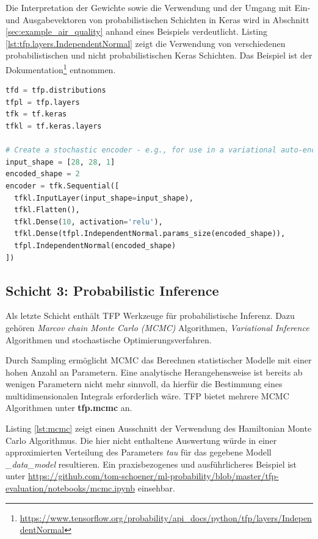 \documentclass[12pt]{article}
\begin{document}
Die Interpretation der Gewichte sowie die Verwendung und der Umgang mit Ein- und Ausgabevektoren von probabilistischen Schichten in Keras wird in Abschnitt \ref{sec:example_air_quality} anhand eines Beispiels verdeutlicht. Listing \ref{lst:tfp.layers.IndependentNormal} zeigt die Verwendung von verschiedenen probabilistischen und nicht probabilistischen Keras Schichten. Das Beispiel ist der Dokumentation\footnote{\url{https://www.tensorflow.org/probability/api_docs/python/tfp/layers/IndependentNormal}} entnommen. 

\begin{lstlisting}[language=Python, caption={Beispiel probabilistischer und nicht probabilistischer Keras Schichten}, label={lst:tfp.layers.IndependentNormal}]
tfd = tfp.distributions
tfpl = tfp.layers
tfk = tf.keras
tfkl = tf.keras.layers

# Create a stochastic encoder - e.g., for use in a variational auto-encoder
input_shape = [28, 28, 1]
encoded_shape = 2
encoder = tfk.Sequential([
  tfkl.InputLayer(input_shape=input_shape),
  tfkl.Flatten(),
  tfkl.Dense(10, activation='relu'),
  tfkl.Dense(tfpl.IndependentNormal.params_size(encoded_shape)),
  tfpl.IndependentNormal(encoded_shape)
])
\end{lstlisting}

\subsection{Schicht 3: Probabilistic Inference}
\label{sec:layer3}
Als letzte Schicht enthält TFP Werkzeuge für probabilistische Inferenz. Dazu gehören \textit{Marcov chain Monte Carlo (MCMC)} Algorithmen, \textit{Variational Inference} Algorithmen und stochastische Optimierungsverfahren. 

Durch Sampling ermöglicht MCMC das Berechnen statistischer Modelle mit einer hohen Anzahl an Parametern. Eine analytische Herangehensweise ist bereits ab wenigen Parametern nicht mehr sinnvoll, da hierfür die Bestimmung eines multidimensionalen Integrals erforderlich wäre. TFP bietet mehrere MCMC Algorithmen unter \textbf{tfp.mcmc} an. 

Listing \ref{lst:mcmc} zeigt einen Ausschnitt der Verwendung des Hamiltonian Monte Carlo Algorithmus. Die hier nicht enthaltene Auswertung würde in einer approximierten Verteilung des Parameters \textit{tau} für das gegebene Modell \textit{\_data\_model} resultieren. Ein praxisbezogenes und ausführlicheres Beispiel ist unter \url{https://github.com/tom-schoener/ml-probability/blob/master/tfp-evaluation/notebooks/mcmc.ipynb} einsehbar.
\end{document}
